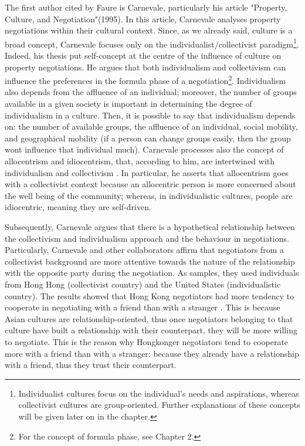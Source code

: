 \documentclass[../main.tex]{subfiles}
\begin{document}
The first author cited by Faure is Carnevale, particularly his article "Property, Culture, and Negotiation"(1995). In this article, Carnevale analyses property negotiations within their cultural context. Since, as we already said, culture is a broad concept, Carnevale focuses only on the individualist/collectivist paradigm\footnote{Individualist cultures focus on the individual's needs and aspirations, whereas collectivist cultures are group-oriented. Further explanations of these concepts will be given later on in the chapter.}. Indeed, his thesis put self-concept at the centre of the influence of culture on property negotiations. He argues that both individualism and collectivism can influence the preferences in the formula phase of a negotiation\footnote{For the concept of formula phase, see Chapter 2.}. Individualism also depends from the affluence of an individual; moreover, the number of groups available in a given society is important in determining the degree of individualism in a culture. Then, it is possible to say that individualism depends on: the number of available groups, the affluence of an individual, social mobility, and geographical mobility (if a person can change groups easily, then the group wont influence that individual much). Carnevale processes also the concept of allocentrism and idiocentrism, that, according to him, are intertwined with individualism and collectivism \autocite[312]{carnevale}. In particular, he asserts that allocentrism goes with a collectivist context because an allocentric person is more concerned about the well being of the community; whereas, in individualistic cultures, people are idiocentric, meaning they are self-driven.

Subsequently, Carnevale argues that there is a hypothetical relationship between the collectivism and individualism approach and the behaviour in negotiations. Particularly, Carnevale and other collaborators affirm that negotiators from a collectivist background are more attentive towards the nature of the relationship with the opposite party during the negotiation. As samples, they used individuals from Hong Hong (collectivist country) and the United States (individualistic country). The results showed that Hong Kong negotiators had more tendency to cooperate in negotiating with a friend than with a stranger \autocite[314]{carnevale}. This is because Asian cultures are relationship-oriented, thus once negotiators belonging to that culture have built a relationship with their counterpart, they will be more willing to negotiate. This is the reason why Hongkonger negotiators tend to cooperate more with a friend than with a stranger: because they already have a relationship with a friend, thus they trust their counterpart.
\end{document}
